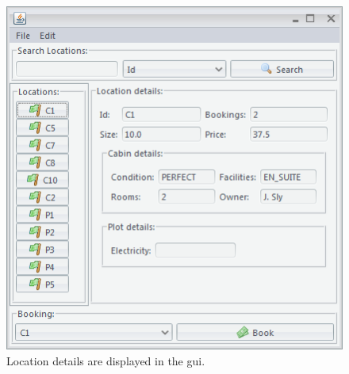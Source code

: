 \begin{figure}[H]
\begin{center}
\includegraphics[scale=0.75]{gfx/display_screen.png} 
\end{center}
\caption{Location details are displayed in the gui.}
\label{fig:details_screen}
\end{figure}